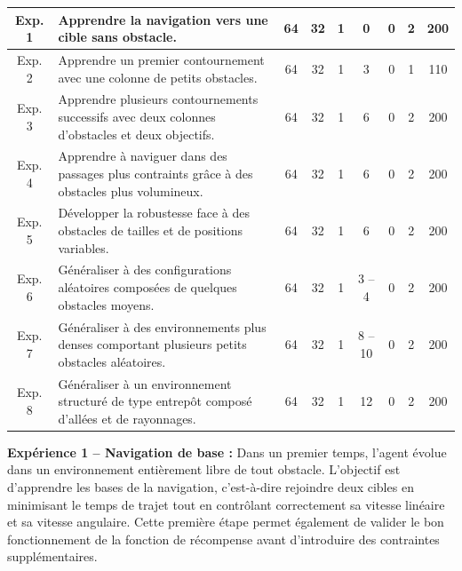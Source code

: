 \begin{longtable}{cp{6cm}ccccccc}
    Exp. 1              & Apprendre la navigation vers une cible sans obstacle.                                           & 64               & 32               & 1              & 0              & 0              & 2              & 200              \\
    \midrule
    Exp. 2              & Apprendre un premier contournement avec une colonne de petits obstacles.                        & 64               & 32               & 1              & 3              & 0              & 1              & 110              \\
    \midrule
    Exp. 3              & Apprendre plusieurs contournements successifs avec deux colonnes d'obstacles et deux objectifs. & 64               & 32               & 1              & 6              & 0              & 2              & 200              \\
    \midrule
    Exp. 4              & Apprendre à naviguer dans des passages plus contraints grâce à des obstacles plus volumineux.   & 64               & 32               & 1              & 6              & 0              & 2              & 200              \\
    \midrule
    Exp. 5              & Développer la robustesse face à des obstacles de tailles et de positions variables.             & 64               & 32               & 1              & 6              & 0              & 2              & 200              \\
    \midrule
    Exp. 6              & Généraliser à des configurations aléatoires composées de quelques obstacles moyens.             & 64               & 32               & 1              & 3 -- 4         & 0              & 2              & 200              \\
    \midrule
    Exp. 7              & Généraliser à des environnements plus denses comportant plusieurs petits obstacles aléatoires.  & 64               & 32               & 1              & 8 -- 10        & 0              & 2              & 200              \\
    \midrule
    Exp. 8              & Généraliser à un environnement structuré de type entrepôt composé d'allées et de rayonnages.    & 64               & 32               & 1              & 12             & 0              & 2              & 200              \\
\end{longtable}

\noindent \textbf{Expérience 1 -- Navigation de base :} Dans un premier temps, l'agent évolue dans un environnement entièrement libre de tout obstacle. L'objectif est d'apprendre les bases de la navigation, c'est-à-dire rejoindre deux cibles en minimisant le temps de trajet tout en contrôlant correctement sa vitesse linéaire et sa vitesse angulaire. Cette première étape permet également de valider le bon fonctionnement de la fonction de récompense avant d'introduire des contraintes supplémentaires.

